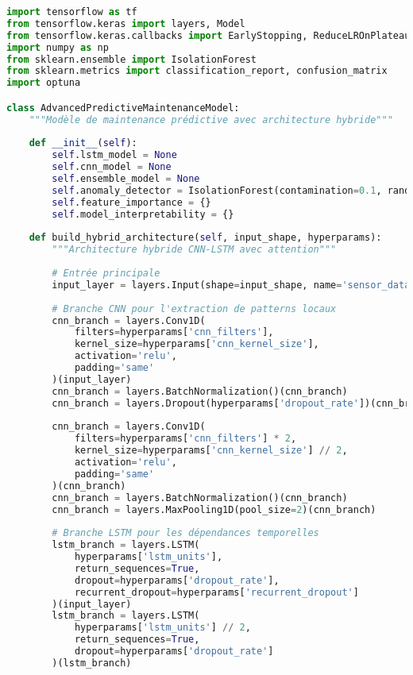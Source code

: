 \documentclass[12pt,a4paper]{report}
\begin{document}
\begin{lstlisting}[language=Python, caption=Modèle de maintenance prédictive avancé]
import tensorflow as tf
from tensorflow.keras import layers, Model
from tensorflow.keras.callbacks import EarlyStopping, ReduceLROnPlateau
import numpy as np
from sklearn.ensemble import IsolationForest
from sklearn.metrics import classification_report, confusion_matrix
import optuna

class AdvancedPredictiveMaintenanceModel:
    """Modèle de maintenance prédictive avec architecture hybride"""
    
    def __init__(self):
        self.lstm_model = None
        self.cnn_model = None
        self.ensemble_model = None
        self.anomaly_detector = IsolationForest(contamination=0.1, random_state=42)
        self.feature_importance = {}
        self.model_interpretability = {}
    
    def build_hybrid_architecture(self, input_shape, hyperparams):
        """Architecture hybride CNN-LSTM avec attention"""
        
        # Entrée principale
        input_layer = layers.Input(shape=input_shape, name='sensor_data')
        
        # Branche CNN pour l'extraction de patterns locaux
        cnn_branch = layers.Conv1D(
            filters=hyperparams['cnn_filters'], 
            kernel_size=hyperparams['cnn_kernel_size'],
            activation='relu',
            padding='same'
        )(input_layer)
        cnn_branch = layers.BatchNormalization()(cnn_branch)
        cnn_branch = layers.Dropout(hyperparams['dropout_rate'])(cnn_branch)
        
        cnn_branch = layers.Conv1D(
            filters=hyperparams['cnn_filters'] * 2,
            kernel_size=hyperparams['cnn_kernel_size'] // 2,
            activation='relu',
            padding='same'
        )(cnn_branch)
        cnn_branch = layers.BatchNormalization()(cnn_branch)
        cnn_branch = layers.MaxPooling1D(pool_size=2)(cnn_branch)
        
        # Branche LSTM pour les dépendances temporelles
        lstm_branch = layers.LSTM(
            hyperparams['lstm_units'],
            return_sequences=True,
            dropout=hyperparams['dropout_rate'],
            recurrent_dropout=hyperparams['recurrent_dropout']
        )(input_layer)
        lstm_branch = layers.LSTM(
            hyperparams['lstm_units'] // 2,
            return_sequences=True,
            dropout=hyperparams['dropout_rate']
        )(lstm_branch)
        

\end{lstlisting}
\end{document}
